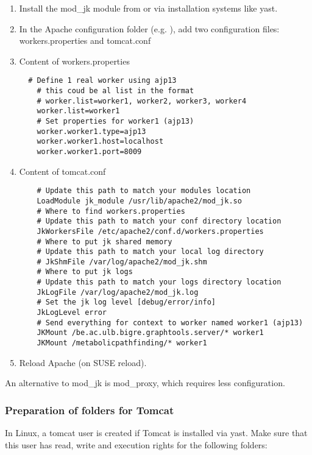 \documentclass{book}
\begin{document}
\begin{enumerate}
\item Install the mod\_jk module from 
      or via installation systems like yast.
\item In the Apache configuration folder
(e.g. ), add two configuration files: workers.properties and tomcat.conf
\item Content of workers.properties
\begin{lstlisting}
  # Define 1 real worker using ajp13
    # this coud be al list in the format
    # worker.list=worker1, worker2, worker3, worker4
    worker.list=worker1
    # Set properties for worker1 (ajp13)
    worker.worker1.type=ajp13
    worker.worker1.host=localhost
    worker.worker1.port=8009
\end{lstlisting}
\item Content of tomcat.conf
\begin{lstlisting}
    # Update this path to match your modules location
    LoadModule jk_module /usr/lib/apache2/mod_jk.so
    # Where to find workers.properties
    # Update this path to match your conf directory location
    JkWorkersFile /etc/apache2/conf.d/workers.properties
    # Where to put jk shared memory
    # Update this path to match your local log directory
    # JkShmFile /var/log/apache2/mod_jk.shm
    # Where to put jk logs
    # Update this path to match your logs directory location
    JkLogFile /var/log/apache2/mod_jk.log
    # Set the jk log level [debug/error/info]
    JkLogLevel error
    # Send everything for context to worker named worker1 (ajp13)
    JKMount /be.ac.ulb.bigre.graphtools.server/* worker1
    JKMount /metabolicpathfinding/* worker1
\end{lstlisting}
\item Reload Apache (on SUSE  reload).
\end{enumerate}

An alternative to mod\_jk is mod\_proxy, which requires less configuration.


\subsubsection{Preparation of folders for Tomcat}
In Linux, a tomcat user is created if Tomcat is installed via yast. Make sure
that this user has read, write and execution rights for the following folders:

\end{document}
